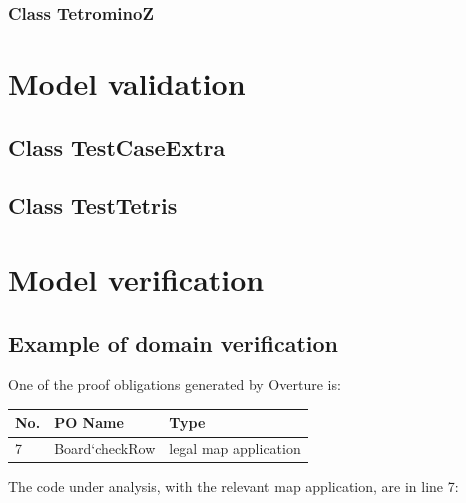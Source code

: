 \documentclass[a4paper]{article}
\begin{document}


\subsubsection{Class TetrominoZ}



\section{Model validation}



\subsection{Class TestCaseExtra} 



\subsection{Class TestTetris} 



\section{Model verification}

\subsection{Example of domain verification} 

One of the proof obligations generated by Overture is:

\begin{table}[!h]
	\centering
	\label{domain-verification}
	\begin{tabular}{|l|l|p{8.5cm}|}
		\hline
		No.  & PO Name & Type	\\	\hline
		7    & Board`checkRow & legal map application	\\	\hline
	\end{tabular}
\end{table}

The code under analysis, with the relevant map application, are in line 7:


\end{document}
